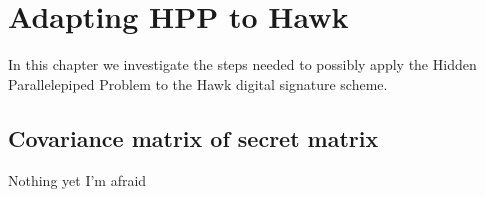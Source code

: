\chapter{Adapting HPP to Hawk}
In this chapter we investigate the steps needed to possibly apply the Hidden Parallelepiped Problem to the Hawk digital signature scheme.
\section{Covariance matrix of secret matrix}
Nothing yet I'm afraid
